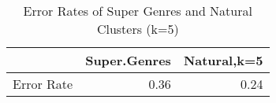 \begin{table}[ht]
\centering
\caption{Error Rates of Super Genres and Natural Clusters (k=5)}
\begin{tabular}{rrr}
  \hline
 & Super.Genres & Natural,k=5 \\ 
  \hline
Error Rate & 0.36 & 0.24 \\ 
   \hline
\end{tabular}
\end{table}
